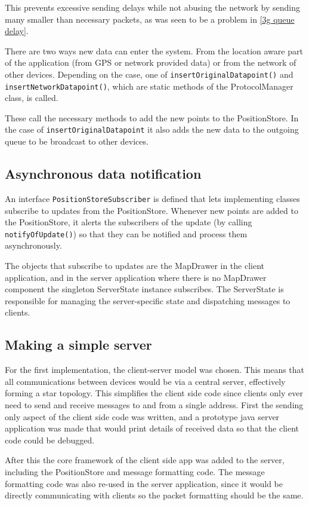This prevents excessive sending delays while not abusing the network by sending many smaller than necessary packets, as was seen to be a problem in \ref{3g queue delay}.

There are two ways new data can enter the system. From the location aware part of the application (from GPS or network provided data) or from the network of other devices. Depending on the case, one of {\tt insertOriginalDatapoint()} and {\tt insertNetworkDatapoint()}, which are static methods of the ProtocolManager class, is called.

These call the necessary methods to add the new points to the PositionStore. In the case of {\tt insertOriginalDatapoint} it also adds the new data to the outgoing queue to be broadcast to other devices.

\subsection{Asynchronous data notification}

An interface {\tt PositionStoreSubscriber} is defined that lets implementing classes subscribe to updates from the PositionStore. Whenever new points are added to the PositionStore, it alerts the subscribers of the update (by calling {\tt notifyOfUpdate()}) so that they can be notified and process them asynchronously.

The objects that subscribe to updates are the MapDrawer in the client application, and in the server application where there is no MapDrawer component the singleton ServerState instance subscribes. The ServerState is responsible for managing the server-specific state and dispatching messages to clients.

\subsection{Making a simple server}

For the first implementation, the client-server model was chosen. This means that all communications between devices would be via a central server, effectively forming a star topology.
This simplifies the client side code since clients only ever need to send and receive messages to and from a single address.
First the sending only aspect of the client side code was written, and a prototype java server application was made that would print details of received data so that the client code could be debugged.

After this the core framework of the client side app was added to the server, including the PositionStore and message formatting code. The message formatting code was also re-used in the server application, since it would be directly communicating with clients so the packet formatting should be the same.

